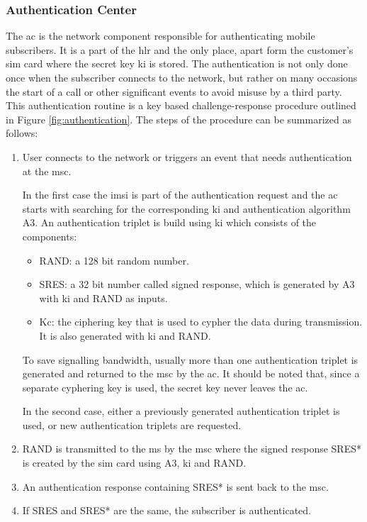 \subsubsection{Authentication Center}
The \gls{ac} is the network component responsible for authenticating mobile subscribers.
It is a part of the \gls{hlr} and the only place, apart form the customer's \gls{sim} card where the secret key \gls{ki} is stored.
The authentication is not only done once when the subscriber connects to the network, but rather on many occasions \eg the start of a call or other significant events to avoid misuse by a third party.
This authentication routine is a key based challenge-response procedure outlined in Figure \ref{fig:authentication}.
The steps of the procedure can be summarized as follows:
\begin{enumerate}
	\item User connects to the network or triggers an event that needs authentication at the \gls{msc}.
 	
 	In the first case the \gls{imsi} is part of the authentication request and the \gls{ac} starts with searching for the corresponding \gls{ki} and authentication algorithm A3.
	An authentication triplet is build using \gls{ki} which consists of the components:
	\begin{itemize}
		\item RAND: a 128 bit random number.
		\item SRES: a 32 bit number called signed response, which is generated by A3 with \gls{ki} and RAND as inputs.
		\item Kc: the ciphering key that is used to cypher the data during transmission.
		It is also generated with \gls{ki} and RAND.
	\end{itemize}
	To save signalling bandwidth, usually more than one authentication triplet is generated and returned to the \gls{msc} by the \gls{ac}.
	It should be noted that, since a separate cyphering key is used, the secret key never leaves the \gls{ac}.
	
	In the second case, either a previously generated authentication triplet is used, or new authentication triplets are requested.
	\item RAND is transmitted to the \gls{ms} by the \gls{msc} where the signed response SRES* is created by the \gls{sim} card using A3, \gls{ki} and RAND.
	
	\item An authentication response containing SRES* is sent back to the \gls{msc}.
	
	\item If SRES and SRES* are the same, the subscriber is authenticated.
\end{enumerate}

